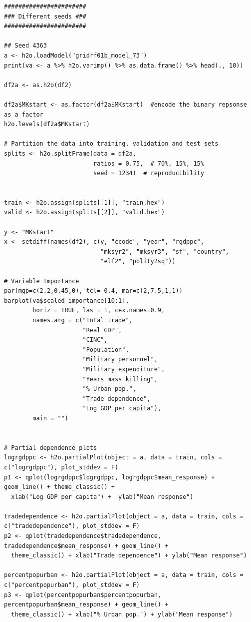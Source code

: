 \documentclass[a4paper,12pt]{article}
\begin{document}
\begin{verbatim}
#######################
### Different seeds ###
#######################

## Seed 4363
a <- h2o.loadModel("gridrf01b_model_73")
print(va <- a %>% h2o.varimp() %>% as.data.frame() %>% head(., 10))

df2a <- as.h2o(df2)

df2a$MKstart <- as.factor(df2a$MKstart)  #encode the binary repsonse as a factor
h2o.levels(df2a$MKstart)

# Partition the data into training, validation and test sets
splits <- h2o.splitFrame(data = df2a, 
                         ratios = 0.75,  # 70%, 15%, 15%
                         seed = 1234)  # reproducibility


train <- h2o.assign(splits[[1]], "train.hex")   
valid <- h2o.assign(splits[[2]], "valid.hex") 

y <- "MKstart"
x <- setdiff(names(df2), c(y, "ccode", "year", "rgdppc",
                           "mksyr2", "mksyr3", "sf", "country",
                           "elf2", "polity2sq"))  

# Variable Importance
par(mgp=c(2.2,0.45,0), tcl=-0.4, mar=c(2,7.5,1,1))
barplot(va$scaled_importance[10:1],
        horiz = TRUE, las = 1, cex.names=0.9,
        names.arg = c("Total trade",
                      "Real GDP",
                      "CINC",
                      "Population", 
                      "Military personnel",
                      "Military expenditure",
                      "Years mass killing",
                      "% Urban pop.",
                      "Trade dependence", 
                      "Log GDP per capita"),
        main = "")


# Partial dependence plots
logrgdppc <- h2o.partialPlot(object = a, data = train, cols = c("logrgdppc"), plot_stddev = F)
p1 <- qplot(logrgdppc$logrgdppc, logrgdppc$mean_response) + geom_line() + theme_classic() +
  xlab("Log GDP per capita") +  ylab("Mean response")

tradedependence <- h2o.partialPlot(object = a, data = train, cols = c("tradedependence"), plot_stddev = F)
p2 <- qplot(tradedependence$tradedependence, tradedependence$mean_response) + geom_line() +
  theme_classic() + xlab("Trade dependence") + ylab("Mean response")

percentpopurban <- h2o.partialPlot(object = a, data = train, cols = c("percentpopurban"), plot_stddev = F)
p3 <- qplot(percentpopurban$percentpopurban, percentpopurban$mean_response) + geom_line() +
  theme_classic() + xlab("% Urban pop.") + ylab("Mean response")


\end{verbatim}
\end{document}
